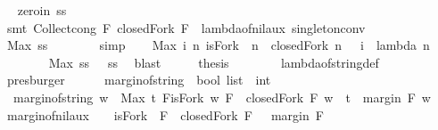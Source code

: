 \begin{isabellebody}
\ \isamarkupfalse%
\ zero{\isacharunderscore}in{\isacharcolon}\ {\isachardoublequoteopen}ss\ {\isacharequal}\ {\isacharbraceleft}{}{\isacharbraceright}{\isachardoublequoteclose}\isanewline
\ \ \ \ \isamarkupfalse%
\ {\isacharparenleft}smt\ Collect{\isacharunderscore}cong\ F\ {\isacartoucheopen}closedFork\ F\ {\isacharbrackleft}{\isacharbrackright}{\isacartoucheclose}\ lambda{\isacharunderscore}of{\isacharunderscore}nil{\isacharunderscore}aux\ singleton{\isacharunderscore}conv{}{\isacharparenright}\isanewline
\ \ \isamarkupfalse%
\ \isamarkupfalse%
\ {\isachardoublequoteopen}Max\ ss\ {\isacharequal}\ {}{\isachardoublequoteclose}\isanewline
\ \ \ \ \isamarkupfalse%
\ simp\isanewline
\ \ \isamarkupfalse%
\ {\isachardoublequoteopen}Max\ {\isacharbraceleft}i{\isachardot}\ {\isasymexists}n{\isachardot}\ isFork\ {\isacharbrackleft}{\isacharbrackright}\ n\ {\isasymand}\ closedFork\ n\ {\isacharbrackleft}{\isacharbrackright}\ {\isasymand}\ i\ {\isacharequal}\ lambda\ n\ {\isacharbrackleft}{\isacharbrackright}{\isacharbraceright}\ {\isacharequal}\ {}{\isachardoublequoteclose}\isanewline
\ \ \ \ \ \ \isamarkupfalse%
\ {\isacartoucheopen}Max\ ss\ {\isacharequal}\ {}{\isacartoucheclose}\ ss\ \isamarkupfalse%
\ blast\isanewline
\ \ \isamarkupfalse%
\ \isamarkupfalse%
\ {\isacharquery}thesis\isanewline
\ \ \ \ \ \ \isamarkupfalse%
\ lambda{\isacharunderscore}of{\isacharunderscore}string{\isacharunderscore}def\ \isamarkupfalse%
\ presburger\isanewline
{}\isamarkupfalse%
%
\endisatagproof
{\isafoldproof}%
%
\isadelimproof
\isanewline
%
\endisadelimproof
\ \ \ \ \isanewline
{}\isamarkupfalse%
\ margin{\isacharunderscore}of{\isacharunderscore}string\ {\isacharcolon}{\isacharcolon}\ {\isachardoublequoteopen}bool\ list\ {\isasymRightarrow}\ int{\isachardoublequoteclose}\ \isanewline
\ \ {\isachardoublequoteopen}margin{\isacharunderscore}of{\isacharunderscore}string\ w\ {\isacharequal}\ Max\ {\isacharbraceleft}t{\isachardot}\ {\isacharparenleft}{\isasymexists}F{\isachardot}{\isacharparenleft}isFork\ w\ F\ {\isasymand}\ closedFork\ F\ w\ {\isasymand}\ t\ {\isacharequal}\ margin\ F\ w{\isacharparenright}{\isacharparenright}{\isacharbraceright}{\isachardoublequoteclose}\isanewline
\isanewline
{}\isamarkupfalse%
\ margin{\isacharunderscore}of{\isacharunderscore}nil{\isacharunderscore}aux\ {\isacharcolon}\ \ \ {\isachardoublequoteopen}isFork\ {\isacharbrackleft}{\isacharbrackright}\ F\ {\isasymand}\ closedFork\ F\ {\isacharbrackleft}{\isacharbrackright}{\isachardoublequoteclose}\ \ {\isachardoublequoteopen}margin\ F\ {\isacharbrackleft}{\isacharbrackright}\ {\isacharequal}\ {}{\isachardoublequoteclose}\ \ \ \isanewline

\end{isabellebody}
